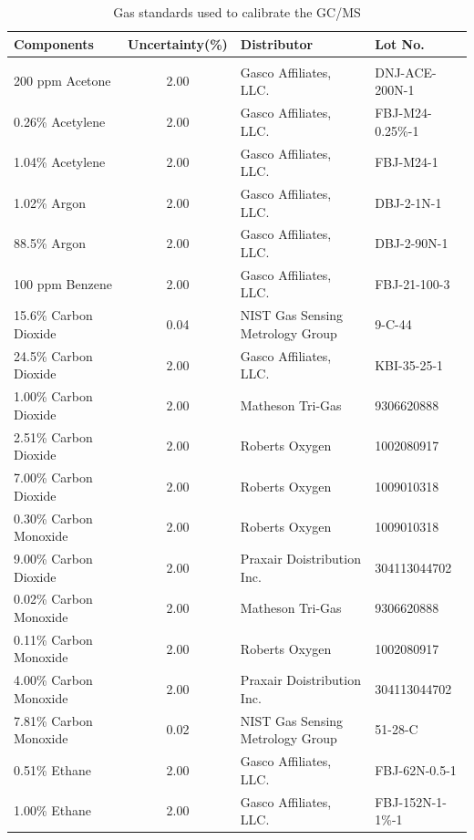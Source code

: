 \documentclass[12pt]{article}
\begin{document}
\begin{table}[h!]

\caption{Gas standards used to calibrate the GC/MS}
\label{tab:Gas_Standards_Table}
\centering
	\footnotesize
	\begin{tabular}{lcll}
			\hline
\textbf{Components} &\textbf{Uncertainty(\%)}& \textbf{Distributor}	& \textbf{Lot No.}		\\
\hline
\\[0.001cm]
200 ppm Acetone		&	2.00	&	Gasco Affiliates, LLC. 				&	DNJ-ACE-200N-1		\\
0.26\% Acetylene		&	2.00	&	Gasco Affiliates, LLC.				&	FBJ-M24-0.25\%-1		\\
1.04\% Acetylene		&	2.00	&	Gasco Affiliates, LLC.				&	FBJ-M24-1			\\
1.02\% Argon		&	2.00	&	Gasco Affiliates, LLC.				&	DBJ-2-1N-1			\\
88.5\% Argon		&	2.00	&	Gasco Affiliates, LLC.				&	DBJ-2-90N-1			\\
100 ppm Benzene		&	2.00	&	Gasco Affiliates, LLC.				&	FBJ-21-100-3		\\
15.6\% Carbon Dioxide	&	0.04	&	NIST Gas Sensing Metrology Group		&	9-C-44			\\
24.5\% Carbon Dioxide	&	2.00	&	Gasco Affiliates, LLC. 				&	KBI-35-25-1			\\
1.00\% Carbon Dioxide	&	2.00	&	Matheson Tri-Gas					&	9306620888			\\
2.51\% Carbon Dioxide	&	2.00	&	Roberts Oxygen					&	1002080917			\\
7.00\% Carbon Dioxide	&	2.00	&	Roberts Oxygen					&	1009010318			\\
0.30\% Carbon Monoxide	&	2.00	&	Roberts Oxygen					&	1009010318			\\
9.00\% Carbon Dioxide	&	2.00	&	Praxair Doistribution Inc. 				&	304113044702		\\
0.02\% Carbon Monoxide	&	2.00	&	Matheson Tri-Gas					&	9306620888			\\
0.11\% Carbon Monoxide	&	2.00	&	Roberts Oxygen					&	1002080917			\\
4.00\% Carbon Monoxide	&	2.00	&	Praxair Doistribution Inc. 				&	304113044702		\\
7.81\% Carbon Monoxide	&	0.02	&	NIST Gas Sensing Metrology Group 		&	51-28-C			\\
0.51\% Ethane		&	2.00	&	Gasco Affiliates, LLC.				&	FBJ-62N-0.5-1		\\
1.00\% Ethane		&	2.00	&	Gasco Affiliates, LLC.				&	FBJ-152N-1-1\%-1		\\

\end{tabular}
\end{table}
\end{document}
